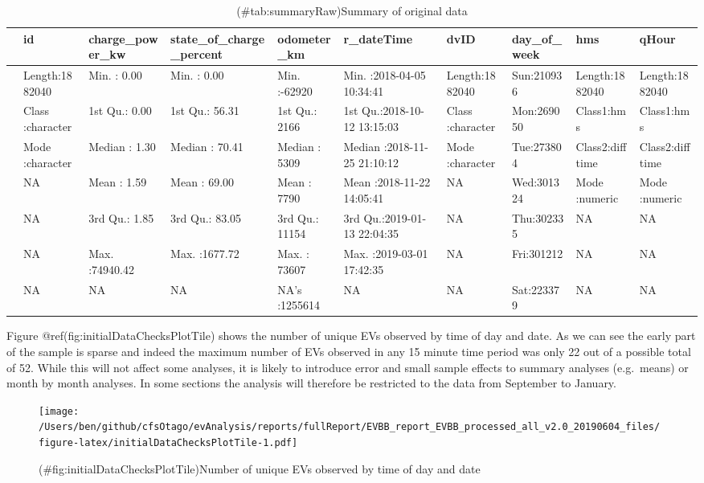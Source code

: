 \documentclass[]{article}
\begin{document}
\begin{table}[t]

\caption{(\#tab:summaryRaw)Summary of original data}
\centering
\begin{tabular}{l|l|l|l|l|l|l|l|l|l}
\hline
  &      id & charge\_power\_kw & state\_of\_charge\_percent &  odometer\_km &   r\_dateTime &     dvID & day\_of\_week &     hms &    qHour\\
\hline
 & Length:1882040 & Min.   :    0.00 & Min.   :   0.00 & Min.   :-62920 & Min.   :2018-04-05 10:34:41 & Length:1882040 & Sun:210936 & Length:1882040 & Length:1882040\\
\hline
 & Class :character & 1st Qu.:    0.00 & 1st Qu.:  56.31 & 1st Qu.:  2166 & 1st Qu.:2018-10-12 13:15:03 & Class :character & Mon:269050 & Class1:hms & Class1:hms\\
\hline
 & Mode  :character & Median :    1.30 & Median :  70.41 & Median :  5309 & Median :2018-11-25 21:10:12 & Mode  :character & Tue:273804 & Class2:difftime & Class2:difftime\\
\hline
 & NA & Mean   :    1.59 & Mean   :  69.00 & Mean   :  7790 & Mean   :2018-11-22 14:05:41 & NA & Wed:301324 & Mode  :numeric & Mode  :numeric\\
\hline
 & NA & 3rd Qu.:    1.85 & 3rd Qu.:  83.05 & 3rd Qu.: 11154 & 3rd Qu.:2019-01-13 22:04:35 & NA & Thu:302335 & NA & NA\\
\hline
 & NA & Max.   :74940.42 & Max.   :1677.72 & Max.   : 73607 & Max.   :2019-03-01 17:42:35 & NA & Fri:301212 & NA & NA\\
\hline
 & NA & NA & NA & NA's   :1255614 & NA & NA & Sat:223379 & NA & NA\\
\hline
\end{tabular}
\end{table}

Figure @ref(fig:initialDataChecksPlotTile) shows the number of unique EVs observed by time of day and date. As we can see the early part of the sample is sparse and indeed the maximum number of EVs observed in any 15 minute time period was only 22 out of a possible total of 52. While this will not affect some analyses, it is likely to introduce error and small sample effects to summary analyses (e.g.~means) or month by month analyses. In some sections the analysis will therefore be restricted to the data from September to January.

\begin{figure}
\centering
\texttt{[image: /Users/ben/github/cfsOtago/evAnalysis/reports/fullReport/EVBB\_report\_EVBB\_processed\_all\_v2.0\_20190604\_files/figure-latex/initialDataChecksPlotTile-1.pdf]}
\caption{(\#fig:initialDataChecksPlotTile)Number of unique EVs observed by time of day and date}
\end{figure}
\end{document}
